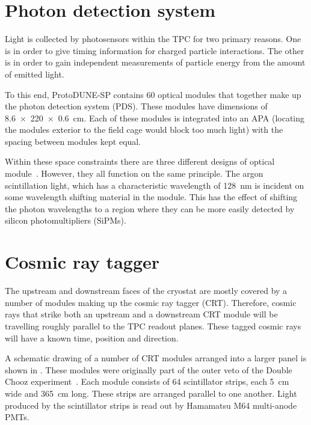 \section{Photon detection system}
\label{sec:protodune:pds}

Light is collected by photosensors within the TPC for two primary reasons. 
One is in order to give timing information for charged particle interactions.
The other is in order to gain independent measurements of particle energy from the amount of emitted light.

To this end, ProtoDUNE-SP contains 60 optical modules that together make up the photon detection system (PDS).
These modules have dimensions of \SI{8.6 x 220 x 0.6}{\cm}.
Each of these modules is integrated into an APA (locating the modules exterior to the field cage would block too much light) with the spacing between modules kept equal.

Within these space constraints there are three different designs of optical module~\cite{protoduneSP_tdr}.
However, they all function on the same principle. 
The argon scintillation light, which has a characteristic wavelength of \SI{128}{\nano\metre} is incident on some wavelength shifting material in the module.
This has the effect of shifting the photon wavelengths to a region where they can be more easily detected by silicon photomultipliers (SiPMs). 

\section{Cosmic ray tagger}
\label{sec:protodune:crt}

The upstream and downstream faces of the cryostat are mostly covered by a number of modules making up the cosmic ray tagger (CRT).
Therefore, cosmic rays that strike both an upstream and a downstream CRT module will be travelling roughly parallel to the TPC readout planes.
These tagged cosmic rays will have a known time, position and direction.

A schematic drawing of a number of CRT modules arranged into a larger panel is shown in .
These modules were originally part of the outer veto of the Double Chooz experiment~\cite{dcIV}.
Each module consists of 64 scintillator strips, each \SI{5}{\cm} wide and \SI{365}{\cm} long.
These strips are arranged parallel to one another.
Light produced by the scintillator strips is read out by Hamamatsu M64 multi-anode PMTs.

